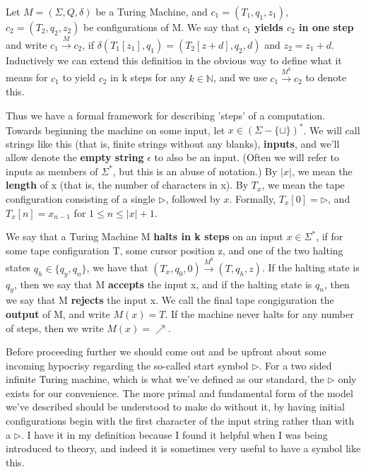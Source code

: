 \begin{definition}
Let $M=(\Sigma,Q,\delta)$ be a Turing Machine, and $c_1=(T_1,q_1,z_1)$, $c_2=(T_2,q_2,z_2)$ be configurations of M. We say that \textbf{$c_1$ yields $c_2$ in one step} and write $c_1 \overset{M}{\to} c_2$, if $\delta(T_1[z_1],q_1)=(T_2[z+d],q_2,d)$ and $z_2=z_1+d$. Inductively we can extend this definition in the obvious way to define what it means for $c_1$ to yield $c_2$ in k steps for any $k\in\mathbb{N}$, and we use $c_1 \overset{M^k}{\to} c_2$ to denote this.
\end{definition}
Thus we have a formal framework for describing 'steps' of a computation. Towards beginning the machine on some input, let $x\in(\Sigma-\{\sqcup\})^*$. We will call strings like this (that is, finite strings without any blanks), \textbf{inputs}, and we'll allow denote the \textbf{empty string} $\epsilon$ to also be an input. (Often we will refer to inputs as members of $\Sigma^*$, but this is an abuse of notation.) By $|x|$, we mean the \textbf{length} of x (that is, the number of characters in x). By $T_x$, we mean the tape configuration consisting of a single $\triangleright$, followed by $x$. Formally, $T_x[0]=\triangleright$, and $T_x[n]=x_{n-1}$ for $1\leq n \leq |x|+1$. 
\begin{definition}
We say that a Turing Machine M \textbf{halts in k steps} on an input $x\in\Sigma^*$, if for some tape configuration T, some cursor position z, and one of the two halting states $q_h \in \{q_y,q_n\}$, we have that $(T_x,q_0,0) \overset{M^k}{\to} (T,q_h,z)$. If the halting state is $q_y$, then we say that M \textbf{accepts} the input x, and if the halting state is $q_n$, then we say that M \textbf{rejects} the input x. We call the final tape congiguration the \textbf{output} of M, and write $M(x)=T$. If the machine never halts for any number of steps, then we write $M(x)=\nearrow$. 
\end{definition}
Before proceeding further we should come out and be upfront about some incoming hypocrisy regarding the so-called start symbol $\triangleright$. For a two sided infinite Turing machine, which is what we've defined as our standard, the $\triangleright$ only exists for our convenience. The more primal and fundamental form of the model we've described should be understood to make do without it, by having initial configurations begin with the first character of the input string rather than with a $\triangleright$. I have it in my definition because I found it helpful when I was being introduced to theory, and indeed it is sometimes very useful to have a symbol like this.


